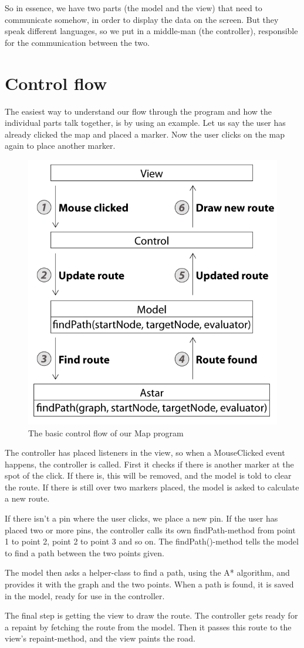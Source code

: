 So in essence, we have two parts (the model and the view) that need to communicate 
somehow, in order to display the data on the screen. But they speak different languages, so 
we put in a middle-man (the controller), responsible for the communication between the two.

\section{Control flow}
\label{UML-CF}
The easiest way to understand our flow through the program and how the individual parts 
talk together, is by using an example. Let us say the user has already clicked the map and 
placed a marker. Now the user clicks on the map again to place another marker.

\begin{figure}[h!]
\centering
\includegraphics[width=0.75\linewidth]{images/SimpleControlFlow}
\caption{The basic control flow of our Map program}
\label{control-flow}
\end{figure}

The controller has placed listeners in the view, so when a MouseClicked event
happens, the controller is called. First it checks if there is another marker
at the spot of the click. If there is, this will be removed, and the model is
told to clear the route. If there is still over two markers placed, the model is
asked to calculate a new route.

If there isn't a pin where the user clicks, we place a new pin. If the user has placed two or 
more pins, the controller calls its own findPath-method from point 1 to point 2, point 2 to 
point 3 and so on. The findPath()-method tells the model to find a path between the two 
points given.

The model then asks a helper-class to find a path, using the A* algorithm, and provides it 
with the graph and the two points. When a path is found, it is saved in the model, ready 
for use in the controller.

The final step is getting the view to draw the route. The controller gets ready for a repaint
by fetching the route from the model. Then it passes this route to the view's repaint-method, 
and the view paints the road.